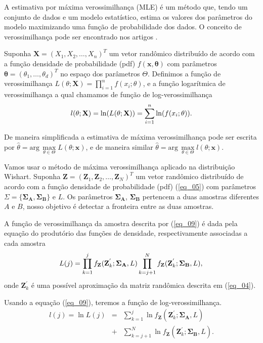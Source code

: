 \documentclass[conference]{IEEEtran}
\begin{document}
 A estimativa por máxima verossimilhança (MLE) é um método que, tendo um conjunto de dados e um modelo estatístico, estima os valores dos parâmetros do modelo maximizando uma função de probabilidade dos dados. O conceito de verossimilhança pode ser encontrado nos artigos \cite{nhfc, gmbf}.

Suponha $\mathbf{X}=(X_1,X_2,\dots,X_n)^T$ um vetor randômico distribuído de acordo com a função densidade de probabilidade (pdf) $f(\mathbf{x},\mathbf{\theta})$ com parâmetros $\mathbf{\theta}=(\theta_1,\dots,\theta_d)^T$ no espaço dos parâmetros $\Theta$. Definimos  a função de verossimilhança $L(\theta;\mathbf{X}) = \prod_{i=1}^{n}f(x_i;\theta)$,
e a função logarítmica de verossimilhança a qual chamamos de função de log-verossimilhança
\begin{equation}\label{eq_09}
	l(\theta;\mathbf{X})= \ln(L(\theta;\mathbf{X})) = \sum_{i=1}^{n}\ln(f(x_i;\theta)). \\
\end{equation}

De maneira simplificada a estimativa de máxima verossimilhança pode ser escrita por $\widehat{\theta}= \text{arg}\,\max\limits_{\theta\in\Theta}L(\theta;\mathbf{x})$,
e de maneira similar $\widehat{\theta}= \text{arg}\,\max\limits_{\theta\in\Theta}l(\theta;\mathbf{x})$.

Vamos usar o método de máxima verossimilhança aplicado na distribuição Wishart. Suponha $\mathbf{Z}=(\mathbf{Z}_1,\mathbf{Z}_2,\dots,\mathbf{Z}_N)^T$ um vetor randômico distribuído de acordo com a função densidade de probabilidade (pdf) (\ref{eq_05}) com parâmetros $\Sigma=\{\mathbf{\Sigma_A}, \mathbf{\Sigma_B\}}$ e $L$. Os parâmetros $\mathbf{\Sigma_A}$, $\mathbf{\Sigma_B}$ pertencem a duas amostras diferentes $A$ e $B$, nosso objetivo é detectar a fronteira entre as duas amostras.

A função de verossimilhança da amostra descrita por (\ref{eq_09}) é dada pela equação do produtório das funções de densidade, respectivamente associadas a cada amostra
\begin{equation}\label{eq_10}
	L(j)=\prod_{k=1}^{j}f_{\mathbf{Z}}(\mathbf{Z}_{k}^{'};\mathbf{\Sigma_{A}},L) \prod_{k=j+1}^{N}f_{\mathbf{Z}}(\mathbf{Z}_{k}^{'};\mathbf{\Sigma_{B}},L), \\
\end{equation}
onde $\mathbf{Z}_{k}^{'}$ é uma possível aproximação da matriz randômica descrita em (\ref{eq_04}).

Usando a equação (\ref{eq_09}), teremos a  função de log-verossimilhança.
\begin{equation}
\begin{array}{rcl}\label{eq_11}
	l(j)=\ln L(j)&=&\sum_{k=1}^{j}\ln f_{\mathbf{Z}}(\mathbf{Z}_{k}^{'};\mathbf{\Sigma_{A}},L)\\
	             &+&\sum_{k=j+1}^{N}\ln f_{\mathbf{Z}}(\mathbf{Z}_{k}^{'};\mathbf{\Sigma_{B}},L).
\end{array}
\end{equation}
\end{document}
